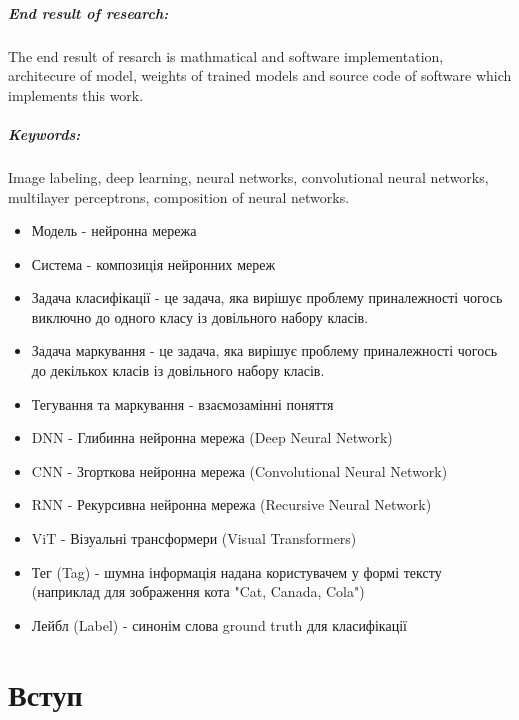 \documentclass{udstu}
\begin{document}
\paragraph{\textbf{End result of research:}}
The end result of resarch is mathmatical and software implementation, architecure of model,
weights of trained models and source code of software which implements this work.

\paragraph{\textbf{Keywords:}}
Image labeling, deep learning, neural networks, convolutional neural networks,
multilayer perceptrons, composition of neural networks.


\shortings

\begin{itemize}[*]
	\item Модель - нейронна мережа
	\item Система - композиція нейронних мереж
	\item Задача класифікації - це задача, яка вирішує проблему приналежності чогось
	виключно до одного класу із довільного набору класів.
	\item Задача маркування - це задача, яка вирішує проблему приналежності чогось
	до декількох класів із довільного набору класів.
	\item Тегування та маркування - взаємозамінні поняття
	\item DNN - Глибинна нейронна мережа (Deep Neural Network)
	\item CNN - Згорткова нейронна мережа (Convolutional Neural Network)
	\item RNN - Рекурсивна нейронна мережа (Recursive Neural Network)
	\item ViT - Візуальні трансформери (Visual Transformers)
	\item Тег (Tag) - шумна інформація надана користувачем у формі тексту
	(наприклад для зображення кота "Cat, Canada, Cola")
	\item Лейбл (Label) - синонім слова ground truth для класифікації
\end{itemize}


\tableofcontents


\chapter{Вступ}
\end{document}

